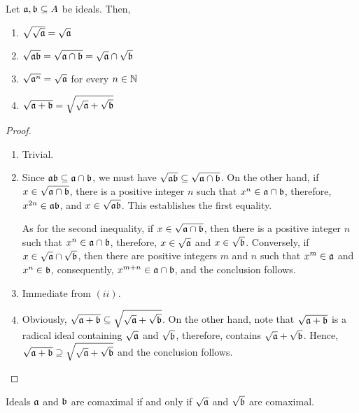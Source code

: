 \begin{proposition}
    Let $\mathfrak a,\mathfrak b\subseteq A$ be ideals. Then, 
    \begin{enumerate}[label=(\roman*)]
        \item $\sqrt{\sqrt{\mathfrak a}} = \sqrt{\mathfrak a}$
        \item $\sqrt{\mathfrak a\mathfrak b} = \sqrt{\mathfrak a\cap\mathfrak b} = \sqrt{\mathfrak a}\cap\sqrt{\mathfrak b}$
        \item $\sqrt{\mathfrak a^n} = \sqrt{\mathfrak a}$ for every $n\in\mathbb{N}$
        \item $\sqrt{\mathfrak a + \mathfrak b} = \sqrt{\sqrt{\mathfrak a} + \sqrt{\mathfrak b}}$
    \end{enumerate}
\end{proposition}
\begin{proof}
\begin{enumerate}[label=(\roman*)]
    \item Trivial.
    \item Since $\mathfrak a\mathfrak b\subseteq\mathfrak a\cap\mathfrak b$, we must have $\sqrt{\mathfrak a\mathfrak b}\subseteq\sqrt{\mathfrak a\cap\mathfrak b}$. On the other hand, if $x\in\sqrt{\mathfrak a\cap\mathfrak b}$, there is a positive integer $n$ such that $x^n\in\mathfrak a\cap\mathfrak b$, therefore, $x^{2n}\in\mathfrak a\mathfrak b$, and $x\in\sqrt{\mathfrak a\mathfrak b}$. This establishes the first equality.

    As for the second inequality, if $x\in\sqrt{\mathfrak a\cap\mathfrak b}$, then there is a positive integer $n$ such that $x^n\in\mathfrak a\cap\mathfrak b$, therefore, $x\in\sqrt{\mathfrak a}$ and $x\in\sqrt{\mathfrak b}$. Conversely, if $x\in\sqrt{\mathfrak a}\cap\sqrt{\mathfrak b}$, then there are positive integers $m$ and $n$ such that $x^m\in\mathfrak a$ and $x^n\in\mathfrak b$, consequently, $x^{m + n}\in\mathfrak a\cap\mathfrak b$, and the conclusion follows. 

    \item Immediate from $(ii)$.
    \item Obviously, $\sqrt{\mathfrak a + \mathfrak b}\subseteq\sqrt{\sqrt{\mathfrak a} + \sqrt{\mathfrak b}}$. On the other hand, note that $\sqrt{\mathfrak a + \mathfrak b}$ is a radical ideal containing $\sqrt{\mathfrak a}$ and $\sqrt{\mathfrak b}$, therefore, contains $\sqrt{\mathfrak a} + \sqrt{\mathfrak b}$. Hence, $\sqrt{\mathfrak a + \mathfrak b}\supseteq\sqrt{\sqrt{\mathfrak a} + \sqrt{\mathfrak b}}$ and the conclusion follows.
\end{enumerate}
\end{proof}
\begin{corollary}
    Ideals $\mathfrak a$ and $\mathfrak b$ are comaximal if and only if $\sqrt{\mathfrak a}$ and $\sqrt{\mathfrak b}$ are comaximal.
\end{corollary}

